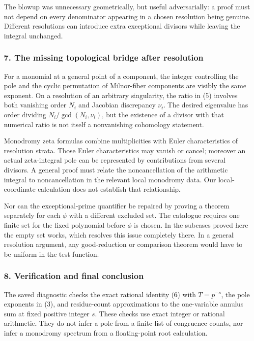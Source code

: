 \documentclass[11pt]{article}
\begin{document}
The blowup was unnecessary geometrically, but useful adversarially: a proof must not depend on every denominator appearing in a chosen resolution being genuine. Different resolutions can introduce extra exceptional divisors while leaving the integral unchanged.

\subsubsection{7. The missing topological bridge after resolution}
For a monomial at a general point of a component, the integer controlling the pole and the cyclic permutation of Milnor-fiber components are visibly the same exponent. On a resolution of an arbitrary singularity, the ratio in (5) involves both vanishing order $N_i$ and Jacobian discrepancy $\nu_i$. The desired eigenvalue has order dividing $N_i/\gcd(N_i,\nu_i)$, but the existence of a divisor with that numerical ratio is not itself a nonvanishing cohomology statement.

Monodromy zeta formulas combine multiplicities with Euler characteristics of resolution strata. Those Euler characteristics may vanish or cancel; moreover an actual zeta-integral pole can be represented by contributions from several divisors. A general proof must relate the noncancellation of the arithmetic integral to noncancellation in the relevant local monodromy data. Our local-coordinate calculation does not establish that relationship.

Nor can the exceptional-prime quantifier be repaired by proving a theorem separately for each $\phi$ with a different excluded set. The catalogue requires one finite set for the fixed polynomial before $\phi$ is chosen. In the subcases proved here the empty set works, which resolves this issue completely there. In a general resolution argument, any good-reduction or comparison theorem would have to be uniform in the test function.

\subsubsection{8. Verification and final conclusion}
The saved diagnostic checks the exact rational identity (6) with $T=p^{-s}$, the pole exponents in (3), and residue-count approximations to the one-variable annulus sum at fixed positive integer $s$. These checks use exact integer or rational arithmetic. They do not infer a pole from a finite list of congruence counts, nor infer a monodromy spectrum from a floating-point root calculation.
\end{document}
